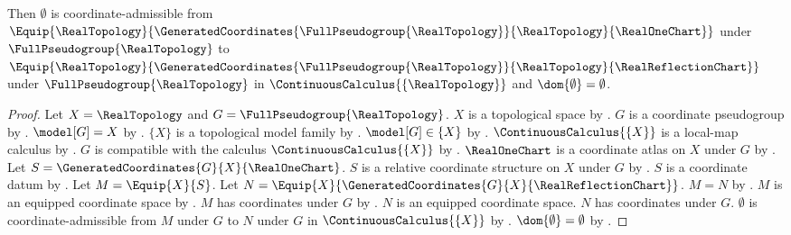 \begin{theorem}\label{real_empty_coordinate_map}
    Then $\emptyset$ is coordinate-admissible
        from $\Equip{\RealTopology}{\GeneratedCoordinates{\FullPseudogroup{\RealTopology}}{\RealTopology}{\RealOneChart}}$
        under $\FullPseudogroup{\RealTopology}$
        to $\Equip{\RealTopology}{\GeneratedCoordinates{\FullPseudogroup{\RealTopology}}{\RealTopology}{\RealReflectionChart}}$
        under $\FullPseudogroup{\RealTopology}$ in $\ContinuousCalculus{\{\RealTopology\}}$
        and $\dom{\emptyset}=\emptyset$.
\end{theorem}
\begin{proof}
    Let $X=\RealTopology$ and $G=\FullPseudogroup{\RealTopology}$.
    $X$ is a topological space by .
    $G$ is a coordinate pseudogroup by .
    $\model[G]=X$ by .
    $\{X\}$ is a topological model family by .
    $\model[G]\in\{X\}$ by .
    $\ContinuousCalculus{\{X\}}$ is a local-map calculus by .
    $G$ is compatible with the calculus $\ContinuousCalculus{\{X\}}$ by
        .
    $\RealOneChart$ is a coordinate atlas on $X$ under $G$ by .
    Let $S=\GeneratedCoordinates{G}{X}{\RealOneChart}$.
    $S$ is a relative coordinate structure on $X$ under $G$ by .
    $S$ is a coordinate datum by .
    Let $M=\Equip{X}{S}$.
    Let $N=\Equip{X}{\GeneratedCoordinates{G}{X}{\RealReflectionChart}}$.
    $M=N$ by .
    $M$ is an equipped coordinate space by .
    $M$ has coordinates under $G$ by .
    $N$ is an equipped coordinate space.
    $N$ has coordinates under $G$.
    $\emptyset$ is coordinate-admissible from $M$ under $G$ to $N$ under $G$
        in $\ContinuousCalculus{\{X\}}$ by .
    $\dom{\emptyset}=\emptyset$ by .
\end{proof}
